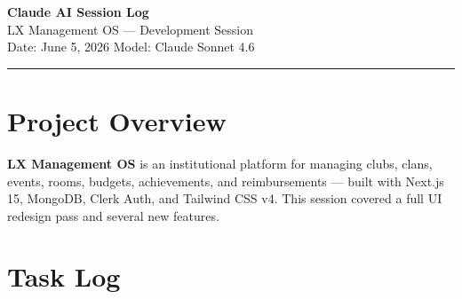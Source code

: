 \documentclass[11pt, a4paper]{article}
\begin{document}
\begin{center}
    {\LARGE \textbf{Claude AI Session Log}} \\[0.4em]
    {\large \textcolor{muted}{LX Management OS — Development Session}} \\[0.2em]
    {\small \textcolor{muted}{Date: June 5, 2026 \quad Model: Claude Sonnet 4.6}}
\end{center}

\vspace{1em}
\noindent\rule{\linewidth}{0.4pt}
\vspace{0.5em}

\section{Project Overview}

\textbf{LX Management OS} is an institutional platform for managing clubs, clans, events, rooms,
budgets, achievements, and reimbursements — built with Next.js 15, MongoDB, Clerk Auth,
and Tailwind CSS v4. This session covered a full UI redesign pass and several new features.

\section{Task Log}
\end{document}
